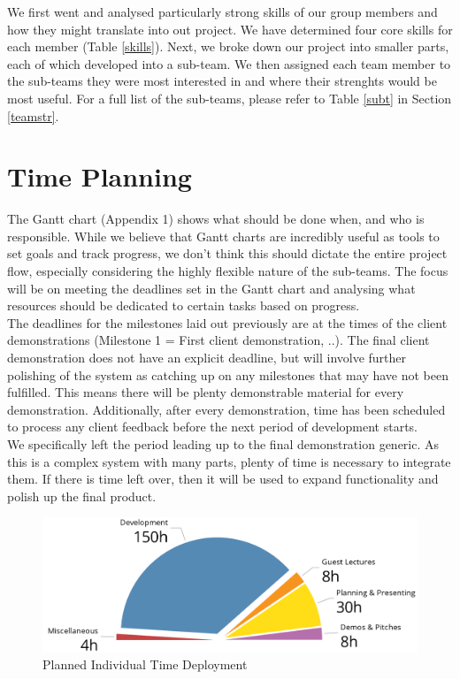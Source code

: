 \documentclass[a4paper,10pt,DIV10,openright,openbib]{scrreprt}
\begin{document}
We first went and analysed particularly strong skills of our group members and how they might translate 
into out project. We have determined four core skills for each member (Table \ref{skills}). Next, we broke down
our project into smaller parts, each of which developed into a sub-team. We then assigned each team member 
to the sub-teams they were most interested in and where their strenghts would be most useful. For a full
list of the sub-teams, please refer to Table \ref{subt} in Section \ref{teamstr}.


\section{Time Planning}



The Gantt chart (Appendix 1) shows what should be done when, and who is responsible.
While we believe that Gantt charts are incredibly useful as tools to set goals and track
progress, we don't think this should dictate the entire project flow, especially considering
the highly flexible nature of the sub-teams. The focus will be on meeting the deadlines set
in the Gantt chart and analysing what resources should be dedicated to certain
tasks based on progress.\\
The deadlines for the milestones laid out previously are at the times of the client demonstrations (Milestone 1 = 
First client demonstration, ..). The final client demonstration does not have an explicit deadline, but will
involve further polishing of the system as catching up on any milestones that may have not been fulfilled.
This means there will be plenty demonstrable material for every demonstration. Additionally,
after every demonstration, time has been scheduled to process any client feedback before the
next period of development starts.\\
We specifically left the period leading up to the final demonstration generic.
As this is a complex system with many parts, plenty of time is necessary to integrate them.
If there is time left over, then it will be used to expand functionality and polish up the final product.\\
\begin{figure}[h]
  \includegraphics[width=\textwidth]{pie.png}
  \caption{Planned Individual Time Deployment}
  \label{piec}
\end{figure}
\end{document}
